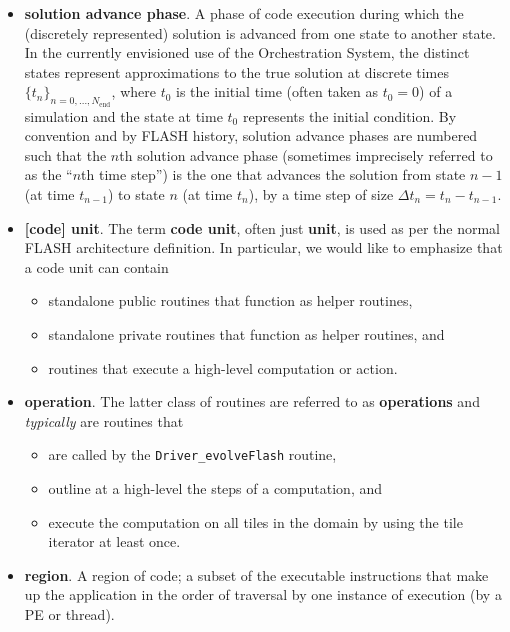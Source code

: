 \documentclass{article}
\begin{document}
\begin{itemize}
\item \textbf{solution advance phase}.
A phase of code execution during which the (discretely represented) solution
is advanced from one state to another state.
In the currently envisioned use of the Orchestration System,
the distinct states represent approximations to the true solution
at discrete times $\{t_n\}_{n=0,\ldots,N_{\mathrm{end}}}$, where
$t_0$ is the initial time (often taken as $t_0=0$) of a simulation and
the state at time $t_0$ represents the initial condition.
By convention and by FLASH history, solution advance phases
are numbered such that
the $n$th solution advance phase (sometimes imprecisely referred
to as the ``$n$th time step'') is the one that
advances the solution from state $n-1$ (at time $t_{n-1}$) to
state $n$ (at time $t_n$),
by a time step of size $\Delta t_n = t_n - t_{n-1}$.


\item \textbf{[code] unit}.
The term \textbf{code unit}, often just \textbf{unit}, is used as per the normal FLASH architecture definition.  In
particular, we would like to emphasize that a code unit can contain
\begin{itemize}
\item{standalone public routines that function as helper routines,}
\item{standalone private routines that function as helper routines, and}
\item{routines that execute a high-level computation or action.}
\end{itemize}

\item \textbf{operation}.
The latter class of routines are referred to as \textbf{operations} and
\textit{typically} are routines that
\begin{itemize}
\item{are called by the \texttt{Driver\_evolveFlash} routine,}
\item{outline at a high-level the steps of a computation, and}
\item{execute the computation on all tiles in the domain by using the tile
iterator at least once.}
\end{itemize}

\item \textbf{region}.
A region of code; a subset of the executable instructions that make up the
application in the order of traversal by one instance of execution
(by a PE or thread).


\end{itemize}
\end{document}
